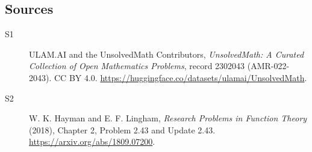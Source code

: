 \documentclass[11pt]{article}
\begin{document}
\subsection{Sources}
\begin{description}
\item[\hypertarget{source:2302043:1}{S1}] ULAM.AI and the UnsolvedMath Contributors, \emph{UnsolvedMath: A Curated Collection of Open Mathematics Problems}, record 2302043 (AMR-022-2043). CC BY 4.0. \url{https://huggingface.co/datasets/ulamai/UnsolvedMath}.
\item[\hypertarget{source:2302043:2}{S2}] W. K. Hayman and E. F. Lingham, \emph{Research Problems in Function Theory} (2018), Chapter 2, Problem 2.43 and Update 2.43. \url{https://arxiv.org/abs/1809.07200}.
\end{description}
\label{end:2302043}
\end{document}
